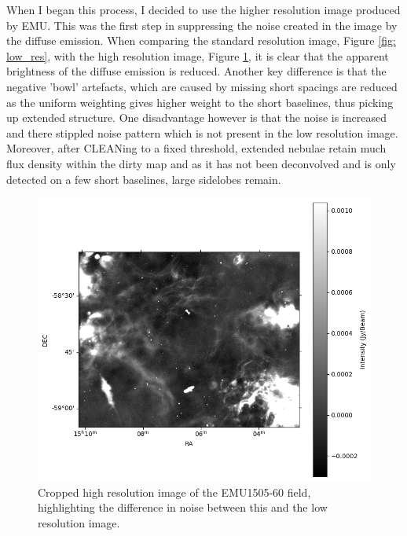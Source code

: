 When I began this process, I decided to use the higher resolution image produced by EMU. This was the first step in suppressing the noise created in the image by the diffuse emission. When comparing the standard resolution image, Figure \ref{fig: low_res}, with the high resolution image, Figure \ref{fig: high res}, it is clear that the apparent brightness of the diffuse emission is reduced. Another key difference is that the negative 'bowl' artefacts, which are caused by missing short spacings are reduced as the uniform weighting gives higher weight to the short baselines, thus picking up extended structure. One disadvantage however is that the noise is increased and there stippled noise pattern which is not present in the low resolution image. Moreover, after CLEANing to a fixed threshold, extended nebulae retain much flux density within the dirty map and as it has not been deconvolved and is only detected on a few short baselines, large sidelobes remain.

\begin{figure}
    \centering
    \includegraphics[width=1\linewidth]{Thesis_Template/Figures/hires_crop.png}
    \caption[Cropped high resolution image of the EMU1505-60 field.]{Cropped high resolution image of the EMU1505-60 field, highlighting the difference in noise between this and the low resolution image.}
    \label{fig: high res}
\end{figure}


